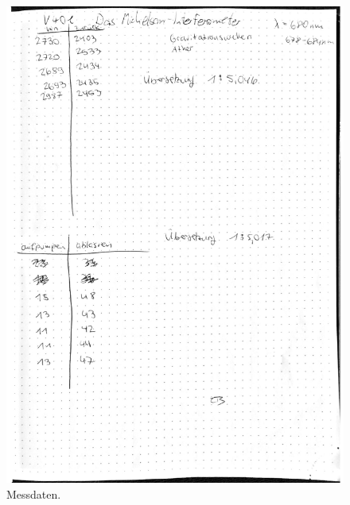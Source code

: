 \begin{figure}
    \centering
    \includegraphics[width=\textwidth]{content/daten.pdf}
    \caption{Messdaten.}
\end{figure}
